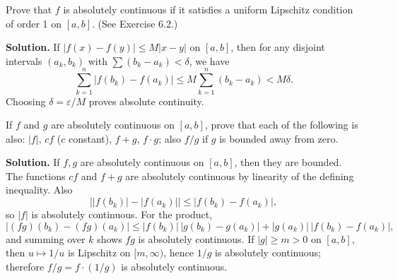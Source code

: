 \begin{problembox}
Prove that $f$ is absolutely continuous if it satisfies a uniform Lipschitz condition of order 1 on $[a, b]$. (See Exercise 6.2.)
\end{problembox}

\noindent\textbf{Solution.}
If $|f(x)-f(y)|\le M|x-y|$ on $[a,b]$, then for any disjoint intervals $(a_k,b_k)$ with $\sum(b_k-a_k)<\delta$, we have
\[\sum_{k=1}^n |f(b_k)-f(a_k)|\le M\sum_{k=1}^n(b_k-a_k)<M\delta.
\]
Choosing $\delta=\varepsilon/M$ proves absolute continuity.

\begin{problembox}
If $f$ and $g$ are absolutely continuous on $[a, b]$, prove that each of the following is also: $|f|$, $cf$ ($c$ constant), $f + g$, $f \cdot g$; also $f/g$ if $g$ is bounded away from zero.
\end{problembox}

\noindent\textbf{Solution.}
If $f,g$ are absolutely continuous on $[a,b]$, then they are bounded. The functions $cf$ and $f+g$ are absolutely continuous by linearity of the defining inequality. Also
\[\big||f(b_k)|-|f(a_k)|\big|\le |f(b_k)-f(a_k)|,\]
so $|f|$ is absolutely continuous. For the product,
\[|(fg)(b_k)-(fg)(a_k)|\le |f(b_k)|\,|g(b_k)-g(a_k)|+|g(a_k)|\,|f(b_k)-f(a_k)|,\]
and summing over $k$ shows $fg$ is absolutely continuous. If $|g|\ge m>0$ on $[a,b]$, then $u\mapsto 1/u$ is Lipschitz on $[m,\infty)$, hence $1/g$ is absolutely continuous; therefore $f/g=f\cdot(1/g)$ is absolutely continuous.